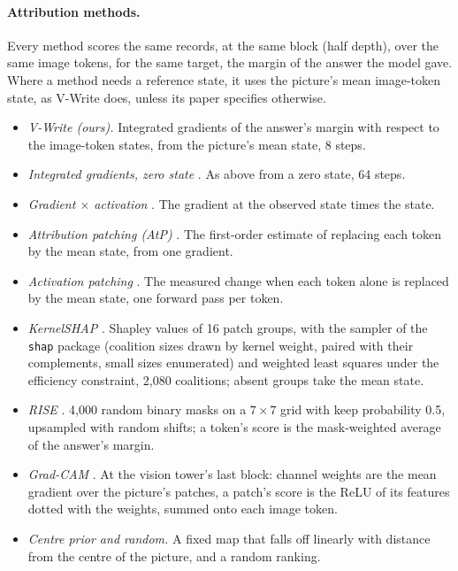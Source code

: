 \paragraph{Attribution methods.} Every method scores the same records, at the same block (half depth), over the same image tokens, for the same target, the margin of the answer the model gave. Where a method needs a reference state, it uses the picture's mean image-token state, as V-Write does, unless its paper specifies otherwise.
\begin{itemize}
\item \emph{V-Write (ours).} Integrated gradients \citep{sundararajan2017axiomaticattributiondeepnetworks} of the answer's margin with respect to the image-token states, from the picture's mean state, 8 steps.
\item \emph{Integrated gradients, zero state} \citep{sundararajan2017axiomaticattributiondeepnetworks}. As above from a zero state, 64 steps.
\item \emph{Gradient $\times$ activation} \citep{shrikumar2017justblackboxlearning}. The gradient at the observed state times the state.
\item \emph{Attribution patching (AtP)} \citep{syed2023attributionpatchingoutperformsautomated, kramár2024atpefficientscalablemethod}. The first-order estimate of replacing each token by the mean state, from one gradient.
\item \emph{Activation patching} \citep{meng2023locatingeditingfactualassociations}. The measured change when each token alone is replaced by the mean state, one forward pass per token.
\item \emph{KernelSHAP} \citep{lundberg2017unifiedapproachinterpretingmodel}. Shapley values of 16 patch groups, with the sampler of the \texttt{shap} package (coalition sizes drawn by kernel weight, paired with their complements, small sizes enumerated) and weighted least squares under the efficiency constraint, 2,080 coalitions; absent groups take the mean state.
\item \emph{RISE} \citep{petsiuk2018riserandomizedinputsampling}. 4,000 random binary masks on a $7\times7$ grid with keep probability 0.5, upsampled with random shifts; a token's score is the mask-weighted average of the answer's margin.
\item \emph{Grad-CAM} \citep{Selvaraju_2019}. At the vision tower's last block: channel weights are the mean gradient over the picture's patches, a patch's score is the ReLU of its features dotted with the weights, summed onto each image token.
\item \emph{Centre prior and random.} A fixed map that falls off linearly with distance from the centre of the picture, and a random ranking.
\end{itemize}

